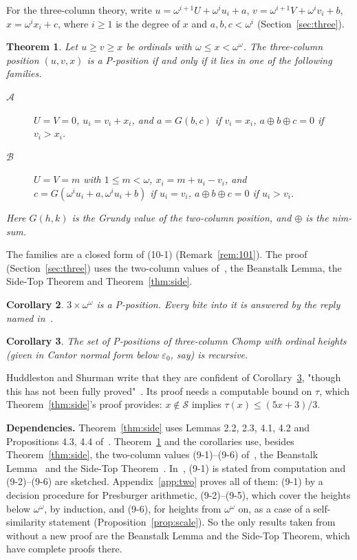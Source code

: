 \documentclass[11pt]{amsart}
\newtheorem{theorem}{Theorem}
\newtheorem{corollary}[theorem]{Corollary}
\theoremstyle{definition}
\theoremstyle{remark}
\newcommand{\Sc}{\mathcal{S}}
\newcommand{\A}{\mathcal{A}}
\newcommand{\B}{\mathcal{B}}
\newcommand{\G}{G}
\newcommand{\nim}{\oplus}
\begin{document}
For the three-column theory, write $u=\omega^{i+1}U+\omega^iu_i+a$, $v=\omega^{i+1}V+\omega^iv_i+b$,
$x=\omega^ix_i+c$, where $i\ge1$ is the degree of $x$ and $a,b,c<\omega^i$
(Section~\ref{sec:three}).

\begin{theorem}\label{thm:three}
Let $u\ge v\ge x$ be ordinals with $\omega\le x<\omega^\omega$. The three-column position
$(u,v,x)$ is a P-position if and only if it lies in one of the following families.
\begin{description}
\item[$\A$] $U=V=0$, $u_i=v_i+x_i$, and $a=\G(b,c)$ if $v_i=x_i$, $a\nim b\nim c=0$ if
  $v_i>x_i$.
\item[$\B$] $U=V=m$ with $1\le m<\omega$, $x_i=m+u_i-v_i$, and
  $c=\G(\omega^iu_i+a,\omega^iu_i+b)$ if $u_i=v_i$, $a\nim b\nim c=0$ if $u_i>v_i$.
\end{description}
Here $\G(h,k)$ is the Grundy value of the two-column position, and $\nim$ is the nim-sum.
\end{theorem}

The families are a closed form of (10-1) (Remark~\ref{rem:101}). The proof
(Section~\ref{sec:three}) uses the two-column values of~\cite[\S9]{HS}, the Beanstalk Lemma,
the Side-Top Theorem and Theorem~\ref{thm:side}.

\begin{corollary}\label{cor:tall}
$3\times\omega^\omega$ is a P-position. Every bite into it is answered by the reply named
in~\cite[\S10]{HS}.
\end{corollary}

\begin{corollary}\label{cor:rec}
The set of P-positions of three-column Chomp with ordinal heights (given in Cantor normal
form below $\varepsilon_0$, say) is recursive.
\end{corollary}

Huddleston and Shurman write that they are confident of Corollary~\ref{cor:rec}, "though this
has not been fully proved"~\cite[\S12]{HS}. Its proof needs a computable bound on $\tau$, which
Theorem~\ref{thm:side}'s proof provides: $x\notin\Sc$ implies $\tau(x)\le (5x+3)/3$.

\medskip
\noindent\textbf{Dependencies.} Theorem~\ref{thm:side} uses Lemmas 2.2, 2.3, 4.1, 4.2 and
Propositions 4.3, 4.4 of~\cite{Sh}. Theorem~\ref{thm:three} and the corollaries use, besides
Theorem~\ref{thm:side}, the two-column values (9-1)--(9-6) of~\cite{HS}, the Beanstalk
Lemma~\cite[Prop.~6.1]{HS} and the Side-Top Theorem~\cite[Thm.~8.1]{HS}. In~\cite{HS},
(9-1) is stated from computation and (9-2)--(9-6) are sketched. Appendix~\ref{app:two}
proves all of them: (9-1) by a decision procedure for Presburger arithmetic, (9-2)--(9-5),
which cover the heights below $\omega^\omega$, by induction, and (9-6), for heights from
$\omega^\omega$ on, as a case of a self-similarity statement
(Proposition~\ref{prop:scale}). So the only results taken from~\cite{HS} without a new proof
are the Beanstalk Lemma and the Side-Top Theorem, which have complete proofs there.
\end{document}
